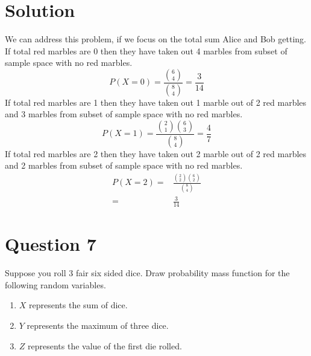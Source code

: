 \documentclass[a4paper, 11pt]{article}
\begin{document}
\section*{Solution}
We can address this problem, if we focus on the total sum Alice and Bob getting. If total red marbles are 0 then they have taken out 4 marbles from subset of sample space with no red marbles.
\[P(X=0)=\frac{\binom{6}{4}}{\binom{8}{4}}=\frac{3}{14}\]
If total red marbles are 1 then they have taken out 1 marble out of 2 red marbles and 3 marbles from subset of sample space with no red marbles.
\[P(X=1)=\frac{\binom{2}{1}\binom{6}{3}}{\binom{8}{4}}=\frac{4}{7}\]
If total red marbles are 2 then they have taken out 2 marble out of 2 red marbles and 2 marbles from subset of sample space with no red marbles.
\begin{equation*}
    \begin{split}
        P(X=2)=&\frac{\binom{2}{2}\binom{6}{2}}{\binom{8}{4}}\\
        =&\frac{3}{14}
    \end{split}
\end{equation*}

\break
\section*{Question 7} Suppose you roll 3 fair six sided dice. Draw probability mass function for the following random variables.
\begin{enumerate}[label=(\alph*)]
    \item $X$ represents the sum of dice.
    \item $Y$ represents the maximum of three dice.
    \item $Z$ represents the value of the first die rolled.
\end{enumerate}
\end{document}
